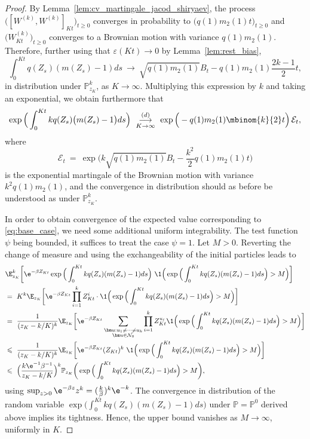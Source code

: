 \begin{refsegment}
\begin{proof}
By Lemma~\ref{lem:cv_martingale_jacod_shiryaev}, the process
$\big([W^{(k)},W^{(k)}]_{Kt}\big)_{t\geqslant 0}$ converges in probability to
$\big(q(1)m_2(1)t\big)_{t\geqslant 0}$ and $\big(W^{(k)}_{Kt}\big)_{t \geqslant 0}$ converges to
a Brownian motion with variance $q(1)m_2(1)$. Therefore, further using
that $\varepsilon(Kt) \to 0$ by Lemma~\ref{lem:rest_bias},
\[
    \int_0^{Kt} q({Z}_s)({m}({Z}_s)-1)ds\ 
    \longrightarrow\ 
    \sqrt{q(1)m_2(1)}B_t - q(1)m_2(1)\frac{2k-1}{2}t,
\] 
in distribution under $\mathbb{P}^k_{z_K}$, as $K \to \infty$. 
Multiplying this expression by $k$ and taking an exponential, we obtain
furthermore that 
\begin{equation}\label{eq:cv_bias}
    \exp\Big(\int_0^{Kt} kq({Z}_s)\big({m}({Z}_s)-1\big)ds\Big)\ \underset{K\to\infty}{\overset{(d)}{\longrightarrow}}\ \exp\Big(-q(1)m_2(1)\mbinom{k}{2}t\Big)\, \mathcal{E}_t,
\end{equation}
where
\[
\mathcal{E}_t\ =\ \exp\Big(k\sqrt{q(1)m_2(1)}B_{t} -\frac{k^2}{2} 
q(1)m_2(1)t\Big)
\]
is the exponential martingale of the  Brownian motion with variance $k^2
q(1)m_2(1)$, and the convergence in distribution should as before be
understood as under $\mathbb{P}^k_{z_K}$.

In order to obtain convergence of the expected value corresponding to \eqref{eq:base_case}, we need some additional uniform integrability. The test function $\psi$ being bounded, it suffices to treat the case $\psi=1$. Let $M>0$. Reverting the change of measure and using the exchangeability of the initial particles leads to
\begin{align*}  
&\E^k_{z_K}\bigg[\e^{-\beta Z_{Kt}}\exp\Big(\int_0^{Kt} kq({Z}_s)({m}({Z}_s)-1)ds\Big)\ \1\Big(\exp\Big(\int_0^{Kt} kq({Z}_s)({m}({Z}_s)-1)ds\Big)>M\Big)\bigg]\\
 & =\ K^k\E_{z_K}\bigg[\e^{-\beta Z_{Kt}}\prod_{i =1}^{k}Z^{i}_{Kt}\cdot \1\Big(\exp\Big(\int_0^{Kt} kq({Z}_s)({m}({Z}_s)-1)ds\Big)>M\Big)\bigg]\\
  &=\ \frac{1}{(z_K-k/K)^k}\E_{z_K}\bigg[\e^{-\beta
 Z_{Kt}}\sum_{\substack{\bm u: u_1\neq\cdots\neq u_k\\ \bm u\in \mathcal{N}_0}} \prod_{i =1}^{k}Z^{u_i}_{Kt} \1\Big(\exp\Big(\int_0^{Kt} kq({Z}_s)({m}({Z}_s)-1)ds\Big)>M\Big)\bigg]\\
&\leqslant\ \frac{1}{(z_K-k/K)^{k}}\E_{z_K}\bigg[\e^{-\beta Z_{Kt}}(Z_{Kt})^k\ \1\Big(\exp\Big(\int_0^{Kt} kq({Z}_s)({m}({Z}_s)-1)ds\Big)>M\Big)\bigg]\\
& \leqslant\ \Big(\frac{k\e^{-1}\beta^{-1}}{z_K-k/K}\Big)^{k} \mathbb{P}_{z_K}\bigg(\exp\Big(\int_0^{Kt} kq({Z}_s)({m}({Z}_s)-1)ds\Big) >M\bigg),
\end{align*}
using $\sup_{z>0} \e^{-\beta z} z^k = (\frac{k}{\beta})^k\e^{-k}$.
The convergence in distribution of the random variable
$\exp\big(\int_0^{Kt} kq({Z}_s)({m}(Z_s)-1)ds\big)$ under
$\mathbb{P}=\mathbb{P}^0$ derived above implies its tightness. Hence, the upper
bound vanishes as $M\to\infty$, uniformly in $K$.
\end{proof}


\end{refsegment}
